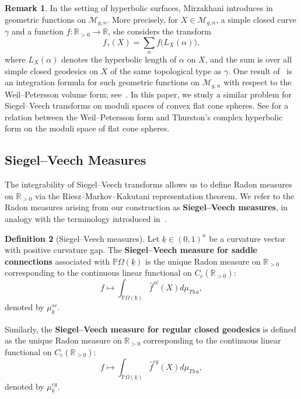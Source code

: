 \documentclass{compositio}
\numberwithin{equation}{section}
\numberwithin{figure}{section}
\theoremstyle{definition}
\newtheorem{definition}{Definition}[section]
\newtheorem{remark}[definition]{Remark}
\theoremstyle{plain}
\begin{document}
{\begin{remark}
In the setting of hyperbolic surfaces, Mirzakhani introduces in~\cite{Mirzakhani2007} geometric functions on $\mathcal{M}_{g,n}$. More precisely, for $X\in \mathcal{M}_{g,n}$, a simple closed curve $\gamma$ and a function $f:\mathbb{R}_{>0}\to \mathbb{R}$, she considers the transform
$$
f_\gamma(X)=\sum_{\alpha} f\bigl(L_X(\alpha)\bigr),
$$
where $L_X(\alpha)$ denotes the hyperbolic length of $\alpha$ on $X$, and the sum is over all simple closed geodesics on $X$ of the same topological type as $\gamma$. One result of~\cite{Mirzakhani2007} is an integration formula for such geometric functions on $\mathcal{M}_{g,n}$ with respect to the Weil--Petersson volume form; see~\cite[Theorem~7.1]{Mirzakhani2007}. In this paper, we study a similar problem for Siegel--Veech transforms on moduli spaces of convex flat cone spheres. See \cite{Wang2025CHWP} for a relation between the Weil--Petersson form and Thurston's complex hyperbolic form on the moduli space of flat cone spheres.
\end{remark}

\subsection{Siegel--Veech Measures}

The integrability of Siegel--Veech transforms allows us to define Radon measures on $\mathbb{R}_{>0}$ via the Riesz–Markov–Kakutani representation theorem. We refer to the Radon measures arising from our construction as \textbf{Siegel--Veech measures}, in analogy with the terminology introduced in~\cite{athreya2019siegel}.


\begin{definition}[Siegel--Veech measures]
    Let $\underline{k}\in (0,1)^n$ be a curvature vector with positive curvature gap. The \textbf{Siegel--Veech measure for saddle connections} associated with $\mathbb{P}\Omega(\underline{k})$ is the unique Radon measure on $\mathbb{R}_{>0}$ corresponding to the continuous linear functional on $C_c(\mathbb{R}_{>0})$:
    $$
        f \mapsto \int_{\mathbb{P}\Omega(\underline k)}\hat{f}^{sc}(X)d\mu_{Thu},
    $$
    denoted by $\mu^{sc}_{\underline{k}}$.
    
    Similarly, the \textbf{Siegel--Veech measure for regular closed geodesics} is defined as the unique Radon measure on $\mathbb{R}_{>0}$ corresponding to the continuous linear functional on $C_c(\mathbb{R}_{>0})$:
    $$
    f \mapsto \int_{\mathbb{P}\Omega(\underline k)}\hat{f}^{cg}(X)d\mu_{Thu},
    $$
    denoted by $\mu^{cg}_{\underline{k}}$.
\end{definition}

}
\end{document}
